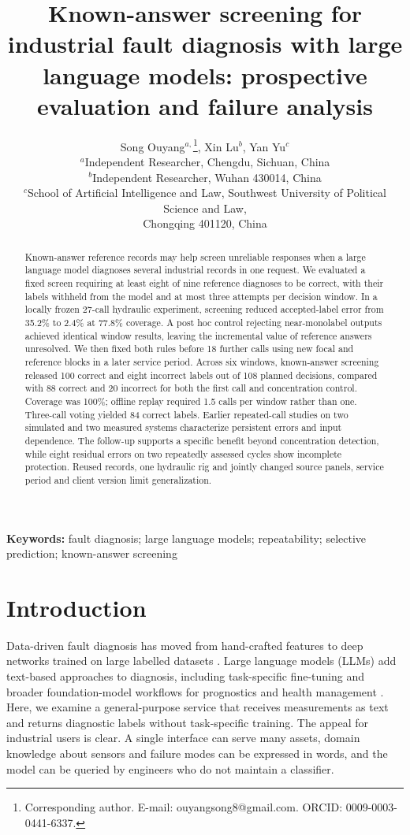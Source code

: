 \documentclass[11pt,a4paper]{article}
\title{Known-answer screening for industrial fault diagnosis with large language models: prospective evaluation and failure analysis}
\author{Song Ouyang$^{a,}$\thanks{Corresponding author. E-mail: ouyangsong8@gmail.com. ORCID: 0009-0003-0441-6337.}, Xin Lu$^{b}$, Yan Yu$^{c}$\\[4pt]
\small $^{a}$Independent Researcher, Chengdu, Sichuan, China\\
\small $^{b}$Independent Researcher, Wuhan 430014, China\\
\small $^{c}$School of Artificial Intelligence and Law, Southwest University of Political Science and Law,\\ \small Chongqing 401120, China}
\date{}
\begin{document}
\maketitle

\begin{abstract}
Known-answer reference records may help screen unreliable responses when a large language model diagnoses several industrial records in one request. We evaluated a fixed screen requiring at least eight of nine reference diagnoses to be correct, with their labels withheld from the model and at most three attempts per decision window. In a locally frozen 27-call hydraulic experiment, screening reduced accepted-label error from 35.2\% to 2.4\% at 77.8\% coverage. A post hoc control rejecting near-monolabel outputs achieved identical window results, leaving the incremental value of reference answers unresolved. We then fixed both rules before 18 further calls using new focal and reference blocks in a later service period. Across six windows, known-answer screening released 100 correct and eight incorrect labels out of 108 planned decisions, compared with 88 correct and 20 incorrect for both the first call and concentration control. Coverage was 100\%; offline replay required 1.5 calls per window rather than one. Three-call voting yielded 84 correct labels. Earlier repeated-call studies on two simulated and two measured systems characterize persistent errors and input dependence. The follow-up supports a specific benefit beyond concentration detection, while eight residual errors on two repeatedly assessed cycles show incomplete protection. Reused records, one hydraulic rig and jointly changed source panels, service period and client version limit generalization.
\end{abstract}
\noindent\textbf{Keywords:} fault diagnosis; large language models; repeatability; selective prediction; known-answer screening

\section{Introduction}
Data-driven fault diagnosis has moved from hand-crafted features to deep networks trained on large labelled datasets \citep{lei2020applications,zhao2019deep}. Large language models (LLMs) add text-based approaches to diagnosis, including task-specific fine-tuning \citep{qaid2026explainable,zheng2024empirical} and broader foundation-model workflows for prognostics and health management \citep{li2024chatgptphm}. Here, we examine a general-purpose service that receives measurements as text and returns diagnostic labels without task-specific training. The appeal for industrial users is clear. A single interface can serve many assets, domain knowledge about sensors and failure modes can be expressed in words, and the model can be queried by engineers who do not maintain a classifier.
\end{document}
